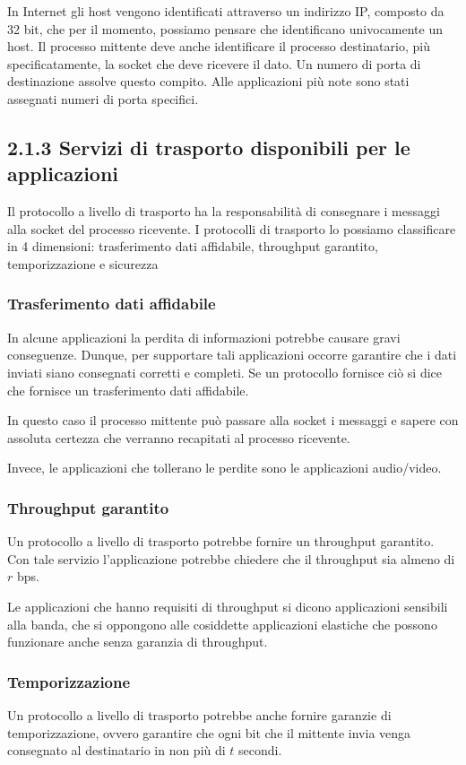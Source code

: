 \documentclass{book}
\begin{document}
In Internet gli host vengono identificati attraverso un indirizzo IP, composto da 32 bit, che per il momento, possiamo pensare che identificano univocamente un host. Il processo mittente deve anche identificare il processo destinatario, più specificatamente, la socket che deve ricevere il dato. Un numero di porta di destinazione assolve questo compito. Alle applicazioni più note sono stati assegnati numeri di porta specifici.

\subsection*{2.1.3 Servizi di trasporto disponibili per le applicazioni}
Il protocollo a livello di trasporto ha la responsabilità di consegnare i messaggi alla socket del processo ricevente. I protocolli di trasporto lo possiamo classificare in 4 dimensioni: trasferimento dati affidabile, throughput garantito, temporizzazione e sicurezza

\subsubsection*{Trasferimento dati affidabile}
In alcune applicazioni la perdita di informazioni potrebbe causare gravi conseguenze. Dunque, per supportare tali applicazioni occorre garantire che i dati inviati siano consegnati corretti e completi. Se un protocollo fornisce ciò si dice che fornisce un trasferimento dati affidabile.

In questo caso il processo mittente può passare alla socket i messaggi e sapere con assoluta certezza che verranno recapitati al processo ricevente.

Invece, le applicazioni che tollerano le perdite sono le applicazioni audio/video.

\subsubsection*{Throughput garantito}
Un protocollo a livello di trasporto potrebbe fornire un throughput garantito. Con tale servizio l'applicazione potrebbe chiedere che il throughput sia almeno di $r$ bps.

Le applicazioni che hanno requisiti di throughput si dicono applicazioni sensibili alla banda, che si oppongono alle cosiddette applicazioni elastiche che possono funzionare anche senza garanzia di throughput.

\subsubsection*{Temporizzazione}
Un protocollo a livello di trasporto potrebbe anche fornire garanzie di temporizzazione, ovvero garantire che ogni bit che il mittente invia venga consegnato al destinatario in non più di $t$ secondi.
\end{document}
